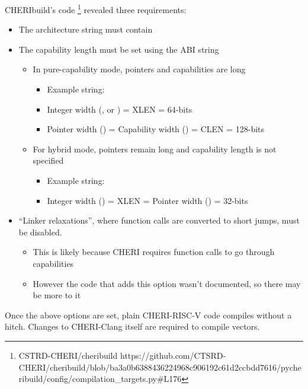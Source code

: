 CHERIbuild's code%
\footnote{%
%
    {CSTRD-CHERI/cheribuild}%
    {https://github.com/CTSRD-CHERI/cheribuild/blob/ba3a0b6388436224968c906192c61d2ccbdd7616/pycheribuild/config/compilation_targets.py\#L176}%
} revealed three requirements:
\begin{itemize}
    \item The architecture string must contain 
    \item The capability length must be set using the ABI string
    \begin{itemize}
        \item In pure-capability mode, pointers and capabilities are  long
        \begin{itemize}
            \item Example string: 
            \item Integer width (, or ) = XLEN = 64-bits
            \item Pointer width () = Capability width () = CLEN = 128-bits
        \end{itemize}
        \item For hybrid mode, pointers remain  long and capability length is not specified
        \begin{itemize}
            \item Example string: 
            \item Integer width () = XLEN = Pointer width () = 32-bits
        \end{itemize}
    \end{itemize}
    \item ``Linker relaxations'', where function calls are converted to short jumps\cite{chenCompilerSupportLinker2019}, must be disabled.
    \begin{itemize}
        \item This is likely because CHERI requires function calls to go through capabilities
        \item However the code that adds this option wasn't documented, so there may be more to it
    \end{itemize}
\end{itemize}

Once the above options are set, plain CHERI-RISC-V code compiles without a hitch.
Changes to CHERI-Clang itself are required to compile vectors.

